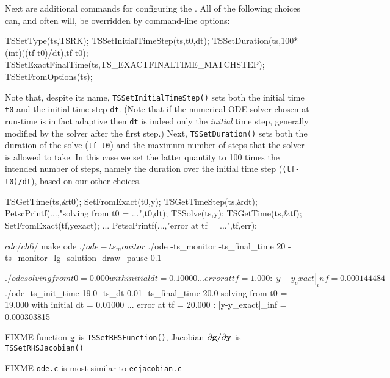Next are additional commands for configuring the \pTS.  All of the following choices can, and often will, be overridden by command-line options:
\begin{code}
  TSSetType(ts,TSRK);
  TSSetInitialTimeStep(ts,t0,dt);
  TSSetDuration(ts,100*(int)((tf-t0)/dt),tf-t0);
  TSSetExactFinalTime(ts,TS_EXACTFINALTIME_MATCHSTEP);
  TSSetFromOptions(ts);
\end{code}
Note that, despite its name, \texttt{TSSetInitialTimeStep()} sets both the initial time \texttt{t0} and the initial time step \texttt{dt}.  (Note that if the numerical ODE solver chosen at run-time is in fact adaptive then \texttt{dt} is indeed only the \emph{initial} time step, generally modified by the solver after the first step.)  Next, \texttt{TSSetDuration()} sets both the duration of the solve (\texttt{tf-t0}) and the maximum number of steps that the solver is allowed to take.  In this case we set the latter quantity to 100 times the intended number of steps, namely the duration over the initial time step (\texttt{(tf-t0)/dt}), based on our other choices.


\begin{code}
  TSGetTime(ts,&t0);
  SetFromExact(t0,y);
  TSGetTimeStep(ts,&dt);
  PetscPrintf(...,"solving from t0 = ...",t0,dt);
  TSSolve(ts,y);
  TSGetTime(ts,&tf);
  SetFromExact(tf,yexact);
  ...
  PetscPrintf(...,"error at tf = ...",tf,err);
\end{code}


\begin{cline}
$ cd c/ch6/
$ make ode
$ ./ode -ts_monitor
$ ./ode -ts_monitor -ts_final_time 20 -ts_monitor_lg_solution -draw_pause 0.1
\end{cline}

\begin{cline}
$ ./ode 
solving from t0 = 0.000 with initial dt = 0.10000 ...
error at tf = 1.000 :  |y-y_exact|_inf = 0.000144484
$ ./ode -ts_init_time 19.0 -ts_dt 0.01 -ts_final_time 20.0
solving from t0 = 19.000 with initial dt = 0.01000 ...
error at tf = 20.000 :  |y-y_exact|_inf = 0.000303815
\end{cline}


FIXME function $\mathbf{g}$ is \texttt{TSSetRHSFunction()}, Jacobian $\partial \mathbf{g}/\partial \mathbf{y}$ is \texttt{TSSetRHSJacobian()}

FIXME \texttt{ode.c} is most similar to \texttt{ecjacobian.c}

